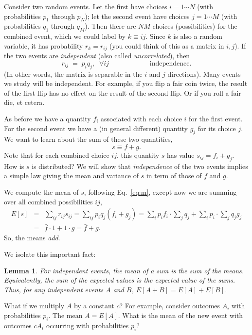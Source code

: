 \documentclass[12pt,letterpaper]{report}
\newcommand\be{\begin{equation}}
\newcommand\ee{\end{equation}}
\newcommand\bea{\begin{eqnarray}}
\newcommand\eea{\end{eqnarray}}
\newtheorem{lem}[thm]{Lemma}
\begin{document}
Consider two random events. Let the first have choices $i=1\cdots
N$ (with probabilities $p_1$ through $p_N$); let the second event
have choices $j=1\cdots M$ (with probabilities $q_1$ through
$q_M$). Then there are $NM$ choices (possibilities) for the
combined event, which we could label by $k\equiv ij$. Since $k$ is
also a random variable, it has probability $r_k = r_{ij}$ (you
could think of this as a matrix in $i,j$). If the two events are
{\em independent} (also called {\em uncorrelated}), then \be
r_{ij} \; = \; p_i q_j, \;\; \forall ij \hspace{1in}
\mbox{independence}. \ee (In other words, the matrix is separable
in the $i$ and $j$ directions). Many events we study will be
independent. For example, if you flip a fair coin twice, the
result of the first flip has no effect on the result of the second
flip. Or if you roll a fair die, et cetera.

As before we have a quantity $f_i$ associated with each choice $i$
for the first event. For the second event we have a (in general
different) quantity $g_j$ for its choice $j$. We want to learn
about the sum of these two quantities, \be s \equiv f + g. \ee
Note that for each combined choice $ij$, this quantity $s$ has
value $s_{ij} = f_i + g_j$. How is $s$ is distributed? We will
show that {\em independence} of the two events implies a simple
law giving the mean and variance of $s$ in term of those of $f$
and $g$.


We compute the mean of $s$, following Eq.~\ref{eq:m}, except now
we are summing over all combined possibilities $ij$, \bea E[s] & =
& \sum_{ij} r_{ij} s_{ij} = \sum_{ij} p_i q_j (f_i + g_j) = \sum_i
p_i f_i \cdot \sum_j q_j + \sum_i p_i \cdot \sum_j q_j g_j
\nonumber \\ & = &\bar{f}\cdot 1 + 1\cdot \bar{g} =
\bar{f}+\bar{g}. \eea So, the means {\em add}.

We isolate this important fact:

\begin{lem}\label{lemmeansum}For independent events, the mean of a sum
is the sum of the means. Equivalently, the sum of the expected
values is the expected value of the sums. Thus, for any
independent events $A$ and $B$, $E[A+B] = E[A] + E[B]$.
\end{lem}


What if we multiply $A$ by a constant $c$? For example, consider
outcomes $A_i$ with probabilities $p_i$. The mean $\bar{A} =
E[A]$. What is the mean of the new event with outcomes $cA_i$
occurring with probabilities $p_i$?
\end{document}
